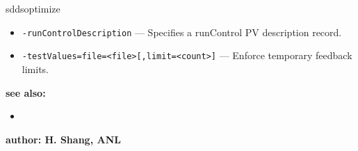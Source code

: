 \begin{sddsprog}{sddsoptimize}
\begin{itemize}
        \item {\tt -runControlDescription} --- Specifies a runControl PV description record.
        \item {\tt -testValues=file=<file>[,limit=<count>]} --- Enforce temporary feedback limits.
  \end{itemize}
\item {\bf see also:}
    \begin{itemize}
    \item {}
    \end{itemize}
\item {\bf author: H. Shang, ANL}
\end{sddsprog}
